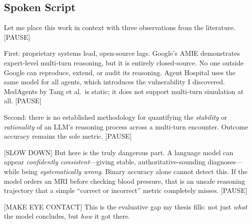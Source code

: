 \documentclass[12pt]{article}
\begin{document}
  \subsection*{Spoken Script}
  \begin{spokenbox}
   Let me place this work in context with three observations from the literature. [PAUSE]

  First: proprietary systems lead, open-source lags. Google's AMIE demonstrates expert-level multi-turn reasoning, but it is entirely closed-source. No one outside Google can reproduce, extend, or audit its reasoning. Agent Hospital uses the same model for all agents, which introduces the vulnerability I discovered. MedAgents by Tang et al.\ is static; it does not support multi-turn simulation at all. [PAUSE]

  Second: there is no established methodology for quantifying the \textit{stability} or \textit{rationality} of an LLM's reasoning process across a multi-turn encounter. Outcome accuracy remains the sole metric. [PAUSE]

  [SLOW DOWN] But here is the truly dangerous part. A language model can appear \textit{confidently consistent}---giving stable, authoritative-sounding diagnoses---while being \textit{systematically wrong}. Binary accuracy alone cannot detect this. If the model orders an MRI before checking blood pressure, that is an unsafe reasoning trajectory that a simple ``correct or incorrect'' metric completely misses. [PAUSE]

  [MAKE EYE CONTACT] This is the evaluative gap my thesis fills: not just \textit{what} the model concludes, but \textit{how} it got there.
  \end{spokenbox}
\end{document}
